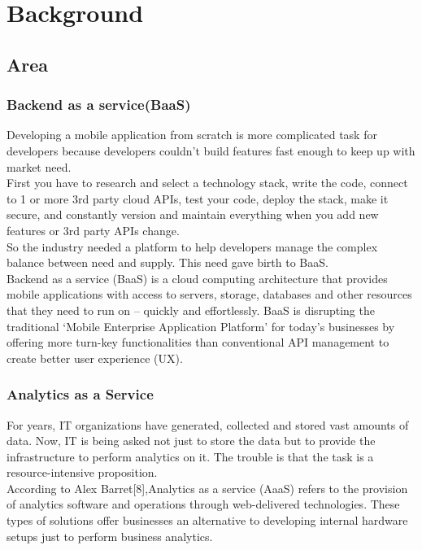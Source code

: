 \documentclass[a4paper,12pt]{report}
\begin{document}
    
    
    \chapter {Background}        
    \section{Area}
    \subsection{Backend as a service(BaaS)}    
    Developing a mobile application from scratch is more complicated task for developers because developers couldn’t build features fast enough to keep up with market need. \\
    First you have to research and select a technology stack, write the code, connect to 1 or more 3rd party cloud APIs, test your code, deploy the stack, make it secure, and constantly version and maintain everything when you add new features or 3rd party APIs change. \\
    So the industry needed a platform to help developers manage the complex balance between need and supply. This need gave birth to BaaS. \\    
    Backend as a service (BaaS) is a cloud computing architecture that provides mobile applications with access to servers, storage, databases and other resources that they need to run on – quickly and effortlessly. BaaS is disrupting the traditional ‘Mobile Enterprise Application Platform’ for today’s businesses by offering more turn-key functionalities than conventional API management to create better user experience (UX). \\
    
    \subsection{Analytics as a Service}    
    For years, IT organizations have generated, collected and stored vast amounts of data. Now, IT is being asked not just to store the data but to provide the infrastructure to perform analytics on it. The trouble is that the task is a resource-intensive proposition. \\    
    According to Alex Barret[8],Analytics as a service (AaaS) refers to the provision of analytics software and operations through web-delivered technologies. These types of solutions offer businesses an alternative to developing internal hardware setups just to perform business analytics. \\
\end{document}
